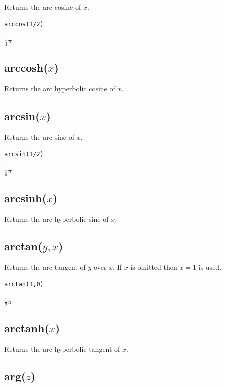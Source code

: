 \documentclass[12pt]{article}
\begin{document}
Returns the arc cosine of $x$.

{\color{blue}
\begin{verbatim}
arccos(1/2)
\end{verbatim}
}

\noindent
$\tfrac{1}{3}\pi$

\subsection*{arccosh($x$)}

Returns the arc hyperbolic cosine of $x$.

\subsection*{arcsin($x$)}

Returns the arc sine of $x$.

{\color{blue}
\begin{verbatim}
arcsin(1/2)
\end{verbatim}
}

\noindent
$\tfrac{1}{6}\pi$

\subsection*{arcsinh($x$)}

Returns the arc hyperbolic sine of $x$.

\subsection*{arctan($y,x$)}

Returns the arc tangent of $y$ over $x$.
If $x$ is omitted then $x=1$ is used.

{\color{blue}
\begin{verbatim}
arctan(1,0)
\end{verbatim}
}

\noindent
$\tfrac{1}{2}\pi$

\subsection*{arctanh($x$)}

Returns the arc hyperbolic tangent of $x$.

\subsection*{arg($z$)}
\end{document}
